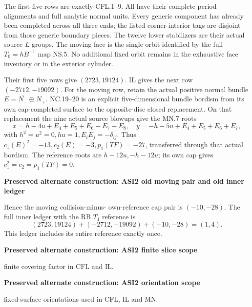 The first five rows are exactly CFL.1--9. All have
their complete period alignments and full analytic
normal units. Every generic component has already
been completed across all three ends; the listed
corner-interior tags are disjoint from those
generic boundary pieces. The twelve lower
stabilizers are their actual source \(L\) groups.
The moving face is the single orbit identified
by the full \(T_0=hB^{-1}\) map NS.5. No additional
fixed orbit remains in the exhaustive face
inventory or in the exterior cylinder.

Their first five rows give \((2723,19124)\).
IL gives the next row \((-2712,-19092)\).
For the moving row, retain the actual positive
normal bundle \(E=\overline{N_-}\oplus N_+\).
NC.19--20 is an explicit five-dimensional bundle
bordism from its own cap-completed surface to
the opposite-disc closed replacement. On that
replacement the nine actual source blowups
give the MN.7 roots
\[
 x=h-4u+E_4+E_5+E_6-E_7-E_8,\quad
 y=-h-5u+E_4+E_5+E_6+E_7,
 \tag{ASI2.40}
\]
with \(h^2=u^2=0,hu=1,E_iE_j=-\delta_{ij}\).
Thus \(c_1(E)^2=-13,c_2(E)=-3,p_1(TF)=-27\),
transferred through that actual bordism.
The reference roots are \(h-12u,-h-12u\);
its own cap gives \(c_1^2=c_2=p_1(TF)=0\).


\par\bigskip\noindent\textbf{Preserved alternate construction: ASI2 old moving pair and old inner ledger}\par
Hence the moving collision-minus-
own-reference cap pair is \((-10,-28)\).
The full inner ledger with the RB \(T_1\) reference is
\[
 (2723,19124)+(-2712,-19092)+(-10,-28)=(1,4).
 \tag{ASI2.42}
\]
This ledger includes its entire reference exactly once.



\par\bigskip\noindent\textbf{Preserved alternate construction: ASI2 finite slice scope}\par
finite covering factor in CFL and IL.

\par\bigskip\noindent\textbf{Preserved alternate construction: ASI2 orientation scope}\par
fixed-surface orientations used in CFL, IL and
MN.

